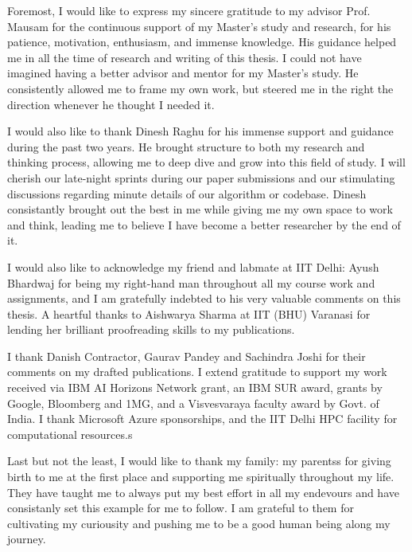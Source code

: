 Foremost, I would like to express my sincere gratitude to my advisor Prof. Mausam for the continuous support of my Master's study and research, for his patience, motivation, enthusiasm, and immense knowledge. His guidance helped me in all the time of research and writing of this thesis. I could not have imagined having a better advisor and mentor for my Master's study. He consistently allowed me to frame my own work, but steered me in the right the direction whenever he thought I needed it.

I would also like to thank Dinesh Raghu for his immense support and guidance during the past two years. He brought structure to both my research and thinking process, allowing me to deep dive and grow into this field of study. I will cherish our late-night sprints during our paper submissions and our stimulating discussions regarding minute details of our algorithm or codebase. Dinesh consistantly brought out the best in me while giving me my own space to work and think, leading me to believe I have become a better researcher by the end of it.

I would also like to acknowledge my friend and labmate at IIT Delhi: Ayush Bhardwaj for being my right-hand man throughout all my course work and assignments, and I am gratefully indebted to his very valuable comments on this thesis. A heartful thanks to Aishwarya Sharma at IIT (BHU) Varanasi for lending her brilliant proofreading skills to my publications.

I thank Danish Contractor, Gaurav Pandey and Sachindra Joshi for their comments on my drafted publications. I extend gratitude to support my work received via IBM AI Horizons Network grant, an IBM SUR award, grants by Google, Bloomberg and 1MG, and a Visvesvaraya faculty award by Govt. of India. I thank Microsoft Azure sponsorships, and the IIT Delhi HPC facility for computational resources.s

Last but not the least, I would like to thank my family: my parentss for giving birth to me at the first place and supporting me spiritually throughout my life. They have taught me to always put my best effort in all my endevours and have consistanly set this example for me to follow. I am grateful to them for cultivating my curiousity and pushing me to be a good human being along my journey.
